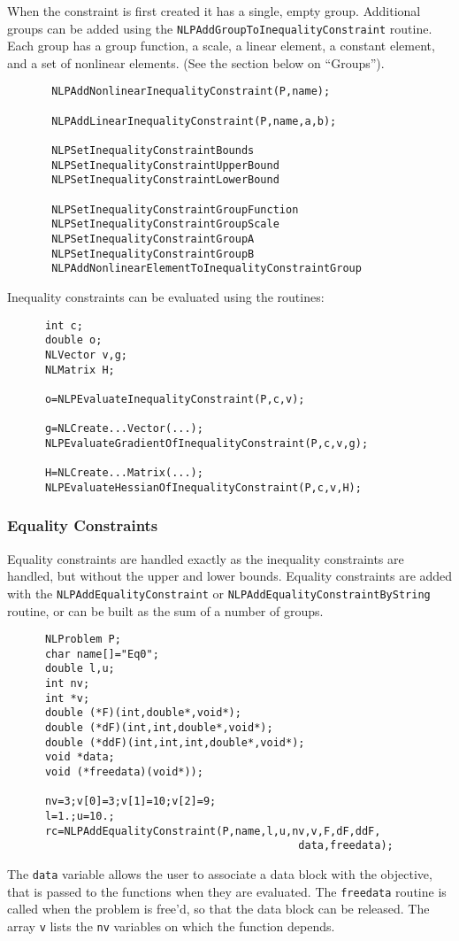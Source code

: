 \documentclass[12pt]{article}
\begin{document}
     When the constraint is first created it has a single, empty group. Additional groups can be added using the
     {\tt NLPAdd\-Group\-To\-Inequality\-Constraint} routine. Each group has a group function, a scale, a linear element,
     a constant element, and a set of nonlinear elements. (See the section below on ``Groups'').
     \begin{verbatim}
       NLPAddNonlinearInequalityConstraint(P,name);

       NLPAddLinearInequalityConstraint(P,name,a,b);

       NLPSetInequalityConstraintBounds
       NLPSetInequalityConstraintUpperBound
       NLPSetInequalityConstraintLowerBound

       NLPSetInequalityConstraintGroupFunction
       NLPSetInequalityConstraintGroupScale
       NLPSetInequalityConstraintGroupA
       NLPSetInequalityConstraintGroupB
       NLPAddNonlinearElementToInequalityConstraintGroup
     \end{verbatim}

     Inequality constraints can be evaluated using the routines:
     \begin{verbatim}
      int c;
      double o;
      NLVector v,g;
      NLMatrix H;

      o=NLPEvaluateInequalityConstraint(P,c,v);

      g=NLCreate...Vector(...);
      NLPEvaluateGradientOfInequalityConstraint(P,c,v,g);

      H=NLCreate...Matrix(...);
      NLPEvaluateHessianOfInequalityConstraint(P,c,v,H);
     \end{verbatim}

   \subsubsection{Equality Constraints}
     Equality constraints are handled exactly as the inequality constraints are handled, but without the
     upper and lower bounds. Equality constraints are added with the {\tt NLPAdd\-Equality\-Constraint}
     or {\tt NLPAdd\-Equality\-Constraint\-ByString} routine, or can be built as the sum of a number of groups.
     \begin{verbatim}
      NLProblem P;
      char name[]="Eq0";
      double l,u;
      int nv;
      int *v;
      double (*F)(int,double*,void*);
      double (*dF)(int,int,double*,void*);
      double (*ddF)(int,int,int,double*,void*);
      void *data;
      void (*freedata)(void*));

      nv=3;v[0]=3;v[1]=10;v[2]=9;
      l=1.;u=10.;
      rc=NLPAddEqualityConstraint(P,name,l,u,nv,v,F,dF,ddF,
                                              data,freedata);

     \end{verbatim}
     The {\tt data} variable allows the user to associate a data block with the objective, that is passed to the
     functions when they are evaluated. The {\tt freedata} routine is called when the problem is free'd, so that
     the data block can be released. The array {\tt v} lists the {\tt nv} variables on which the function depends.
\end{document}
